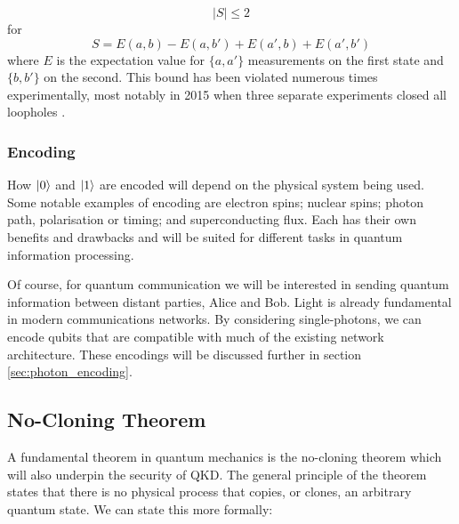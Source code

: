 \begin{equation}
	|S| \le 2
\end{equation}
for
\begin{equation}
	S = E(a,b) - E(a, b') + E(a',b) + E(a',b')
\end{equation}
where $E$ is the expectation value for $\{a,a'\}$ measurements on the first state and $\{b,b'\}$ on the second. This bound has been violated numerous times experimentally, most notably in 2015 when three separate experiments closed all loopholes \cite{Giustina2015, shalm2015, hensen2015}.

\subsubsection{Encoding}

How $\ket{0}$ and $\ket{1}$ are encoded will depend on the physical system being used. Some notable examples of encoding are electron spins; nuclear spins; photon path, polarisation or timing; and superconducting flux. Each has their own benefits and drawbacks and will be suited for different tasks in quantum information processing. 

Of course, for quantum communication we will be interested in sending quantum information between distant parties, Alice and Bob. Light is already fundamental in modern communications networks. By considering single-photons, we can encode qubits that are compatible with much of the existing network architecture. These encodings will be discussed further in section \ref{sec:photon_encoding}.




\subsection{No-Cloning Theorem}

A fundamental theorem in quantum mechanics is the {\color{bristol-red} no-cloning theorem} which will also underpin the security of \ac{QKD}. The general principle of the theorem states that there is no physical process that copies, or clones, an arbitrary quantum state. We can state this more formally:

